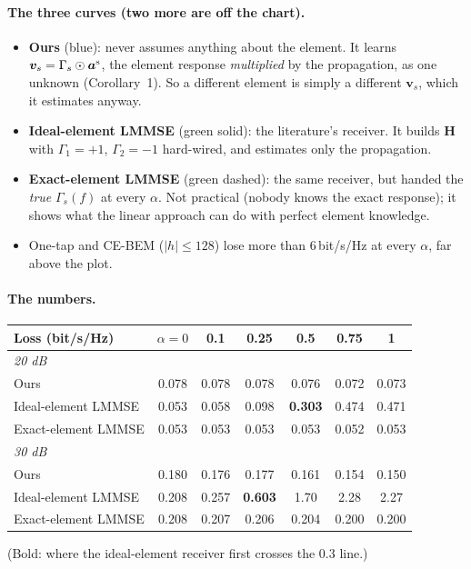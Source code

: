 \documentclass[11pt,a4paper]{article}
\begin{document}
\paragraph{The three curves (two more are off the chart).}
\begin{itemize}
\item \textbf{Ours} (blue): never assumes anything about the element. It learns $\bm v_s=\Gamma_s\odot\bm a^{\rm s}$, the
element response \emph{multiplied} by the propagation, as one unknown (Corollary~1). So a different element is simply a
different $\bm v_s$, which it estimates anyway.
\item \textbf{Ideal-element LMMSE} (green solid): the literature's receiver. It builds $\bm H$ with $\Gamma_1=+1$,
$\Gamma_2=-1$ hard-wired, and estimates only the propagation.
\item \textbf{Exact-element LMMSE} (green dashed): the same receiver, but handed the \emph{true} $\Gamma_s(f)$ at every
$\alpha$. Not practical (nobody knows the exact response); it shows what the linear approach can do with perfect element
knowledge.
\item One-tap and CE-BEM ($|h|\le128$) lose more than 6\,bit/s/Hz at every $\alpha$, far above the plot.
\end{itemize}

\paragraph{The numbers.}
\begin{center}\small
\begin{tabular}{lcccccc}
\toprule
Loss (bit/s/Hz) & $\alpha=0$ & 0.1 & 0.25 & 0.5 & 0.75 & 1\\
\midrule
\multicolumn{7}{l}{\emph{20 dB}}\\
\textcolor{cA}{Ours} & 0.078 & 0.078 & 0.078 & 0.076 & 0.072 & 0.073\\
Ideal-element LMMSE & 0.053 & 0.058 & 0.098 & \textbf{0.303} & 0.474 & 0.471\\
Exact-element LMMSE & 0.053 & 0.053 & 0.053 & 0.053 & 0.052 & 0.053\\
\midrule
\multicolumn{7}{l}{\emph{30 dB}}\\
\textcolor{cA}{Ours} & 0.180 & 0.176 & 0.177 & 0.161 & 0.154 & 0.150\\
Ideal-element LMMSE & 0.208 & 0.257 & \textbf{0.603} & 1.70 & 2.28 & 2.27\\
Exact-element LMMSE & 0.208 & 0.207 & 0.206 & 0.204 & 0.200 & 0.200\\
\bottomrule
\end{tabular}
\end{center}
(Bold: where the ideal-element receiver first crosses the 0.3 line.)
\end{document}
